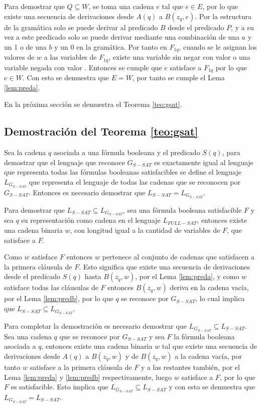 Para demostrar que $Q\subseteq W$, se toma una cadena $e$ tal que $e\in E$, por lo que existe una secuencia de derivaciones desde $A(q)$ a $B(z_q,e)$. Por la estructura de la gramática solo se puede derivar al predicado $B$ desde el predicado $P$, y a su vez a este predicado solo se puede derivar mediante una combinación de una $a$ y un 1 o de una $b$ y un 0 en la gramática. Por tanto en $F_{1q}$, cuando se le asignan los valores de $w$ a las variables de $F_{1q}$, existe una variable 
sin negar con valor \true{} o una variable negada con valor \false{}.  Entonces se cumple que $e$ satisface a $F_{1q}$ por lo que $e\in W$. Con esto se demuestra que $E=W$, por tanto se cumple el Lema \ref{lem:preda}.

En la próxima sección se demuestra el Teorema \ref{teo:gsat}.

\subsection{Demostración del Teorema \ref{teo:gsat}}
Sea la cadena $q$ asociada a una fórmula booleana y el predicado $S(q)$, para demostrar que el lenguaje que reconoce $G_{S-SAT}$ es exactamente igual al lenguaje que representa todas las fórmulas booleanas satisfacibles se define el lenguaje $L_{G_{S-SAT}}$ que representa el lenguaje de todas las cadenas que se reconocen por $G_{S-SAT}$. Entonces es necesario demostrar que $L_{S-SAT}=L_{G_{S-SAT}}$.

Para demostrar que $L_{S-SAT}\subseteq L_{G_{S-SAT}}$, sea una fórmula booleana satisfacible $F$ y sea $q$ su representación como cadena en el lenguaje $L_{FULL-SAT}$, entonces existe una cadena binaria $w$, con longitud igual a la cantidad de variables de $F$, que satisface a $F$.

Como $w$ satisface $F$ entonces $w$ pertenece al conjunto de cadenas que satisfacen a la primera cláusula de $F$. Esto significa que existe una secuencia de derivaciones desde el predicado $S(q)$ hasta $B(z_q,w)$, por el Lema \ref{lem:preda}, y como $w$ satisface todas las cláusulas de $F$ entonces $B(z_q,w)$ deriva en la cadena vacía, por el Lema \ref{lem:predb}, por lo que $q$ se reconoce por $G_{S-SAT}$, lo cual implica que $L_{S-SAT}\subseteq L_{G_{S-SAT}}$.

Para completar la demostración es necesario demostrar que $ L_{G_{S-SAT}}\subseteq L_{S-SAT}$. Sea una cadena $q$ que se reconoce por $G_{S-SAT}$ y sea $F$ la fórmula booleana asociada a $q$, entonces existe una cadena binaria $w$ tal que existe una secuencia de derivaciones desde $A(q)$ a $B(z_q,w)$ y de $B(z_q,w)$ a la cadena vacía, por tanto $w$ satisface a la primera cláusula de $F$ y a las restantes también, por el Lema \ref{lem:preda} y \ref{lem:predb} respectivamente, luego $w$ satisface a $F$, por lo que $F$ es satisfacible. Esto implica que $L_{G_{S-SAT}}\subseteq L_{S-SAT}$ y con esto se demuestra que $L_{G_{S-SAT}}= L_{S-SAT}$.

